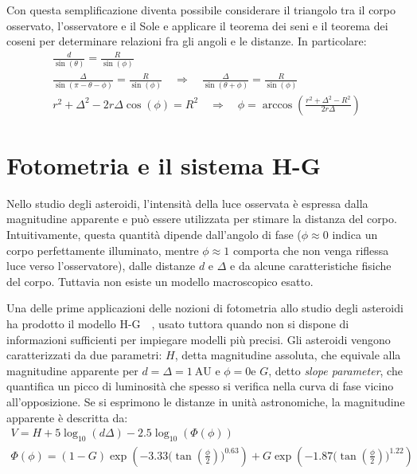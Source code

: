 \documentclass[12pt,a4paper,openright,twoside]{book}
\begin{document}
Con questa semplificazione diventa possibile considerare il triangolo tra il corpo osservato, l'osservatore e il Sole e applicare il teorema dei seni e il teorema dei coseni per determinare relazioni fra gli angoli e le distanze. In particolare:
\begin{gather}
\frac{d}{\sin(\theta)}=\frac{R}{\sin(\phi)}\label{eq:sinelaw-d} \\[0.5em]
\frac{\Delta}{\sin(\pi-\theta-\phi)}=\frac{R}{\sin(\phi)}\quad\Rightarrow\quad\frac{\Delta}{\sin(\theta+\phi)}=\frac{R}{\sin(\phi)}\label{eq:sinelaw-delta} \\[0.5em]
r^2+\Delta^2-2r\Delta\cos(\phi)=R^2\quad\Rightarrow\quad\phi=\arccos\left(\frac{r^2+\Delta^2-R^2}{2r\Delta}\right)\label{eq:cosinelaw-phi}
\end{gather}

\section{Fotometria e il sistema H-G}\label{sec:photometry}

Nello studio degli asteroidi, l'intensità della luce osservata è espressa dalla magnitudine apparente e può essere utilizzata per stimare la distanza del corpo. Intuitivamente, questa quantità dipende dall'angolo di fase ($\phi\approx0$ indica un corpo perfettamente illuminato, mentre $\phi\approx1$ comporta che non venga riflessa luce verso l'osservatore), dalle distanze $d$ e $\Delta$ e da alcune caratteristiche fisiche del corpo. Tuttavia non esiste un modello macroscopico esatto.

Una delle prime applicazioni delle nozioni di fotometria allo studio degli asteroidi ha prodotto il modello H-G~\cite{bowell1989}~\cite{dymock2007}, usato tuttora quando non si dispone di informazioni sufficienti per impiegare modelli più precisi. Gli asteroidi vengono caratterizzati da due parametri: $H$, detta magnitudine assoluta, che equivale alla magnitudine apparente per $d=\Delta=1~\mathrm{AU}$ e $\phi=0$\quad e $G$, detto \textit{slope parameter}, che quantifica un picco di luminosità che spesso si verifica nella curva di fase vicino all'opposizione. Se si esprimono le distanze in unità astronomiche, la magnitudine apparente è descritta da:
\begin{gather}
V=H+5\log_{10}(d\Delta)-2.5\log_{10}(\Phi(\phi))\label{eq:hg-mag} \\
\Phi(\phi)=(1-G)\exp\left(-3.33\bigl(\tan\left(\tfrac{\phi}{2}\right)\bigr)^{0.63}\right)+G\exp\left(-1.87\bigl(\tan\left(\tfrac{\phi}{2}\right)\bigr)^{1.22}\right)
\end{gather}
\end{document}
